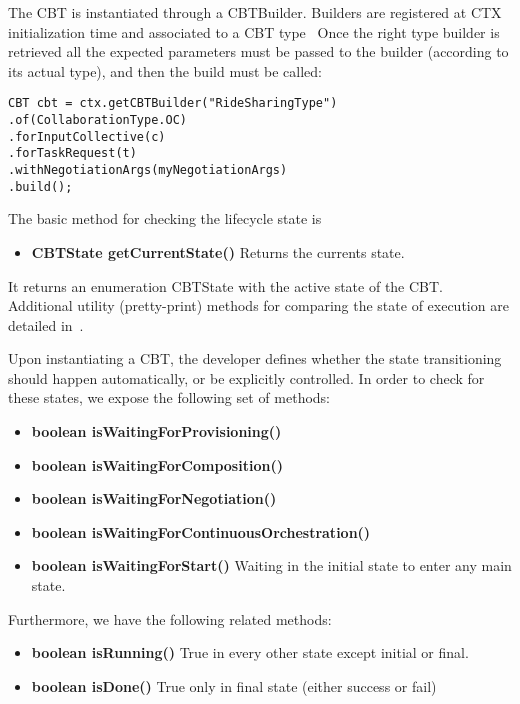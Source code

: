 The CBT is instantiated through a CBTBuilder. Builders are registered at CTX initialization time and associated to a CBT type~\cite{D7.2} 
Once the right type builder is retrieved all the expected parameters must be passed to the builder (according to its actual type), and then the build must be called:
\begin{lstlisting}
CBT cbt = ctx.getCBTBuilder("RideSharingType")
.of(CollaborationType.OC) 
.forInputCollective(c)
.forTaskRequest(t)
.withNegotiationArgs(myNegotiationArgs)
.build();
\end{lstlisting}

The basic method for checking the lifecycle state is 
\begin{itemize}
\item {\bf CBTState getCurrentState()} Returns the currents state.
\end{itemize}
It returns an enumeration CBTState with the active state of the CBT. Additional utility (pretty-print) methods for comparing the state of execution are detailed in~\cite{D7.2}.

Upon instantiating a CBT, the developer defines whether the state transitioning should happen automatically, or be explicitly controlled. 
In order to check for these states, we expose the following set of methods:
\begin{itemize}
\item {\bf boolean isWaitingForProvisioning()}
\item {\bf boolean isWaitingForComposition()}
\item {\bf boolean isWaitingForNegotiation()}
\item {\bf boolean isWaitingForContinuousOrchestration()}
\item {\bf boolean isWaitingForStart()} Waiting in the initial state to enter any main state.
\end{itemize}
Furthermore, we have the following related methods:
\begin{itemize}
\item {\bf boolean isRunning()} True in every other state except initial or final.
\item {\bf boolean isDone()} True only in final state (either success or fail)
\end{itemize}

